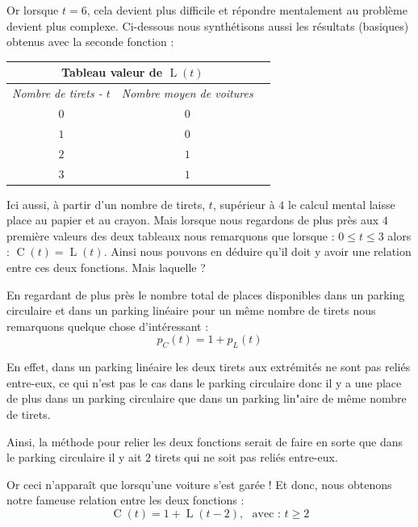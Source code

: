 \documentclass[a4paper,francais,11pt]{article}
\begin{document}
Or lorsque $t=6$, cela devient plus difficile et répondre mentalement au problème devient plus complexe. Ci-dessous nous synthétisons aussi les résultats (basiques) obtenus avec la seconde fonction :
\begin{center}
\begin{tabular}{|c||c|c|}
    \hline
    \multicolumn{2}{|c|}{\textbf{Tableau valeur de $\operatorname{L}\left(t\right)$}} \\ \hline\hline
        \multirow{1}{*}{\emph{Nombre de tirets - $t$}} & \emph{Nombre moyen de voitures} \\ \hline\hline
        \multirow{1}{*}{$0$} & $0$ \\ \hline
        \multirow{1}{*}{$1$} & $0$ \\ \hline
        \multirow{1}{*}{$2$} & $1$ \\ \hline
        \multirow{1}{*}{$3$} & $1$ \\
    \hline
\end{tabular}
\end{center}

Ici aussi, à partir d'un nombre de tirets, $t$, supérieur à $4$ le calcul mental laisse place au papier et au crayon. Mais lorsque nous regardons de plus près aux $4$ première valeurs des deux tableaux nous remarquons que lorsque : $0\leqslant t \leqslant 3$ alors : $\operatorname{C}\left(t\right)=\operatorname{L}\left(t\right)$. Ainsi nous pouvons en déduire qu'il doit y avoir une relation entre ces deux fonctions. Mais laquelle ?

En regardant de plus près le nombre total de places disponibles dans un parking circulaire et dans un parking linéaire pour un même nombre de tirets nous remarquons quelque chose d'intéressant :
\[p_{C}\left(t\right)=1+p_{L}\left(t\right)\]

En effet, dans un parking linéaire les deux tirets aux extrémités ne sont pas reliés entre-eux, ce qui n'est pas le cas dans le parking circulaire donc il y a une place de plus dans un parking circulaire que dans un parking lin"aire de même nombre de tirets. 

Ainsi, la méthode pour relier les deux fonctions serait de faire en sorte que dans le parking circulaire il y ait $2$ tirets qui ne soit pas reliés entre-eux. 

Or ceci n'apparaît que lorsqu'une voiture s'est garée ! Et donc, nous obtenons notre fameuse relation entre les deux fonctions :
\[\operatorname{C}\left(t\right)=1+\operatorname{L}\left(t-2\right),\ \ \ \text{avec : $t\geqslant 2$}\]
\end{document}
